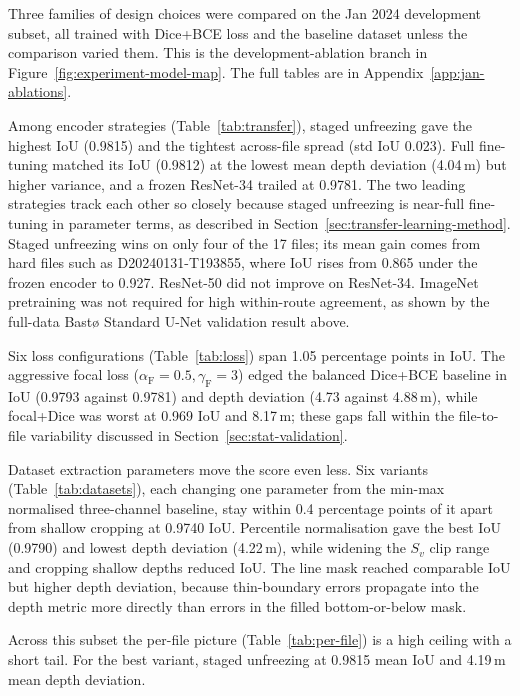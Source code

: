 Three families of design choices were compared on the Jan 2024 development subset, all trained with Dice+BCE loss and the baseline dataset unless the comparison varied them. This is the development-ablation branch in Figure~\ref{fig:experiment-model-map}. The full tables are in Appendix~\ref{app:jan-ablations}.

Among encoder strategies (Table~\ref{tab:transfer}), staged unfreezing gave the highest IoU (0.9815) and the tightest across-file spread (std IoU 0.023). Full fine-tuning matched its IoU (0.9812) at the lowest mean depth deviation (4.04\,m) but higher variance, and a frozen ResNet-34 trailed at 0.9781. The two leading strategies track each other so closely because staged unfreezing is near-full fine-tuning in parameter terms, as described in Section~\ref{sec:transfer-learning-method}. Staged unfreezing wins on only four of the 17 files; its mean gain comes from hard files such as D20240131-\allowbreak T193855, where IoU rises from 0.865 under the frozen encoder to 0.927. ResNet-50 did not improve on ResNet-34. ImageNet pretraining was not required for high within-route agreement, as shown by the full-data Bast\o{} Standard U-Net validation result above.

Six loss configurations (Table~\ref{tab:loss}) span 1.05 percentage points in IoU. The aggressive focal loss ($\alpha_{\mathrm{F}}=0.5, \gamma_{\mathrm{F}}=3$) edged the balanced Dice+BCE baseline in IoU (0.9793 against 0.9781) and depth deviation (4.73 against 4.88\,m), while focal+Dice was worst at 0.969 IoU and 8.17\,m; these gaps fall within the file-to-file variability discussed in Section~\ref{sec:stat-validation}.

Dataset extraction parameters move the score even less. Six variants (Table~\ref{tab:datasets}), each changing one parameter from the min-max normalised three-channel baseline, stay within 0.4 percentage points of it apart from shallow cropping at 0.9740 IoU. Percentile normalisation gave the best IoU (0.9790) and lowest depth deviation (4.22\,m), while widening the $S_v$ clip range and cropping shallow depths reduced IoU. The line mask reached comparable IoU but higher depth deviation, because thin-boundary errors propagate into the depth metric more directly than errors in the filled bottom-or-below mask.

Across this subset the per-file picture (Table~\ref{tab:per-file}) is a high ceiling with a short tail. For the best variant, staged unfreezing at 0.9815 mean IoU and 4.19\,m mean depth deviation.


